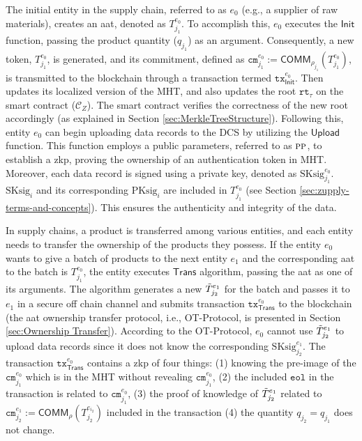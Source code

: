 The initial entity in the supply chain, referred to as $e_{0}$ (e.g., a supplier of raw materials), creates an \gls{aat}, denoted as $T^{e_{0}}_{j_1}$. To accomplish this, $e_{0}$ executes the $\mathsf{Init}$ function, passing the product quantity ($q_{j_1}$) as an argument. Consequently, a new token, $T^{e_{0}}_{j_1}$, is generated, and its commitment, defined as $\texttt{cm}^{e_{0}}_{j_1} := \mathsf{COMM}_{\rho_{j_1}}(T^{e_{0}}_{j_1})$, is transmitted to the blockchain through a transaction termed $\texttt{tx}^{e_{0}}_\mathsf{Init}$. Then updates its localized version of the \textsf{MHT}, and also updates the root $\texttt{rt}_\tau$ on the smart contract ($\mathcal{C}_Z$). The smart contract verifies the correctness of the new root accordingly (as explained in Section \ref{sec:MerkleTreeStructure}). Following this, entity $e_0$ can begin uploading data records to the DCS by utilizing the $\mathsf{Upload}$ function. This function employs a public parameters, referred to as $\textsc{pp}$, to establish a \gls{zkp}, proving the ownership of an authentication token in \textsf{MHT}. Moreover, each data record is signed using a private key, denoted as \( \text{SKsig}^{e_{0}}_{{j_1}} \). $\text{SKsig}_{i}$ and its corresponding $\text{PKsig}_{i}$ are included in \( T^{e_{0}}_{j_1} \) (see Section \ref{sec:zupply-terms-and-concepts}). This ensures the authenticity and integrity of the data.



In supply chains, a product is transferred among various entities, and each entity needs to transfer the ownership of the products they possess. If the entity $e_{0}$ wants to give a batch of products to the next entity $e_{1}$ and the corresponding \gls{aat} to the batch is $T^{e_{0}}_{j_1}$, the entity executes $\mathsf{Trans}$ algorithm, passing the \gls{aat} as one of its arguments. The algorithm generates a new $\Tilde{T}^{e_{1}}_{j_2}$ for the batch and passes it to $e_{1}$ in a secure off chain channel and submits transaction $\texttt{tx}^{e_{0}}_\mathsf{Trans}$ to the blockchain (the \gls{aat} ownership transfer protocol, i.e., \textsf{OT-Protocol}, is presented in Section \ref{sec:Ownership Transfer}). According to the \textsf{OT-Protocol}, $e_{0}$ cannot use $\Tilde{T}^{e_{1}}_{j_2}$ to upload data records since it does not know the corresponding $\text{SKsig}^{e_{1}}_{j_2}$. The transaction $\texttt{tx}^{e_{0}}_\mathsf{Trans}$ contains a \gls{zkp} of four things: (1) knowing the pre-image of the $\texttt{cm}_{j_1}^{e_{0}}$ which is in the \textsf{MHT} without revealing $\texttt{cm}_{j_1}^{e_{0}}$, (2) the included $\texttt{eol}$ in the transaction is related to  $\texttt{cm}_{j_1}^{e_{0}}$, (3) the proof of knowledge of $\Tilde{T}^{e_{1}}_{j_2}$ related to $\texttt{cm}^{e_{1}}_{j_2} := \mathsf{COMM}_\rho(T^{e_{i_2}}_{j_2})$ included in the transaction (4) the quantity $q_{j_2}=q_{j_1}$ does not change.

